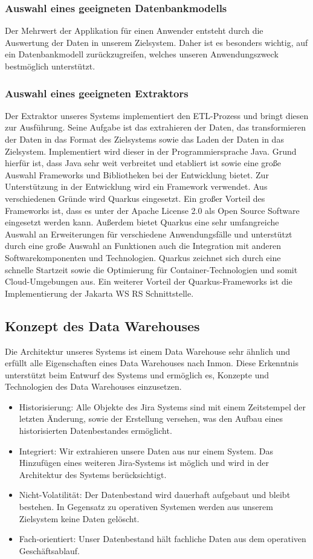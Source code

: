 \documentclass[10pt]{article}
\begin{document}
\subsubsection{Auswahl eines geeigneten Datenbankmodells}
Der Mehrwert der Applikation für einen Anwender entsteht durch die Auswertung der Daten in unserem Zielsystem. Daher ist es besonders wichtig, auf ein Datenbankmodell zurückzugreifen, welches unseren Anwendungszweck bestmöglich unterstützt.
\subsubsection{Auswahl eines geeigneten Extraktors}
Der Extraktor unseres Systems implementiert den ETL-Prozess und bringt diesen zur Ausführung. Seine Aufgabe ist das extrahieren der Daten, das transformieren der Daten in das Format des Zielsystems sowie das Laden der Daten in das Zielsystem. Implementiert wird dieser in der Programmiersprache Java. Grund hierfür ist, dass Java sehr weit verbreitet und etabliert ist sowie eine große Auswahl Frameworks und Bibliotheken bei der Entwicklung bietet. Zur Unterstützung in der Entwicklung wird ein Framework verwendet. Aus verschiedenen Gründe wird Quarkus eingesetzt. Ein großer Vorteil des Frameworks ist, dass es unter der Apache License 2.0 als Open Source Software eingesetzt werden kann. Außerdem bietet Quarkus eine sehr umfangreiche Auswahl an Erweiterungen für verschiedene Anwendungsfälle und unterstützt durch eine große Auswahl an Funktionen auch die Integration mit anderen Softwarekomponenten und Technologien. Quarkus zeichnet sich durch eine schnelle Startzeit sowie die Optimierung für Container-Technologien und somit Cloud-Umgebungen aus. Ein weiterer Vorteil der Quarkus-Frameworks ist die Implementierung der Jakarta WS RS Schnittstelle.
\subsection{Konzept des Data Warehouses}
Die Architektur unseres Systems ist einem Data Warehouse sehr ähnlich und erfüllt alle Eigenschaften eines Data Warehouses nach Inmon. Diese Erkenntnis unterstützt beim Entwurf des Systems und ermöglich es, Konzepte und Technologien des Data Warehouses einzusetzen.
\begin{itemize}
  \item Historisierung: Alle Objekte des Jira Systems sind mit einem Zeitstempel der letzten Änderung, sowie der Erstellung versehen, was den Aufbau eines historisierten Datenbestandes ermöglicht.
  \item Integriert: Wir extrahieren unsere Daten aus nur einem System. Das Hinzufügen eines weiteren Jira-Systems ist möglich und wird in der Architektur des Systems berücksichtigt.
  \item Nicht-Volatilität: Der Datenbestand wird dauerhaft aufgebaut und bleibt bestehen. In Gegensatz zu operativen Systemen werden aus unserem Zielsystem keine Daten gelöscht.
  \item Fach-orientiert: Unser Datenbestand hält fachliche Daten aus dem operativen Geschäftsablauf.
\end{itemize}
\end{document}
